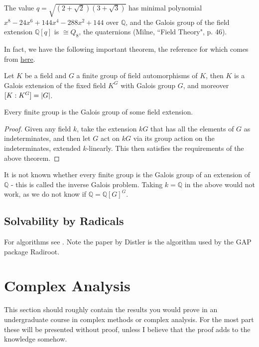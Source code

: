 \documentclass{article}
\begin{document}
\begin{example}
	The value $q = \sqrt{(2+\sqrt{2})(3+\sqrt{3})}$ has minimal polynomial $x^8 - 24x^6 + 144x^4 - 288x^2 + 144$ over $\mathbb{Q}$, and the Galois group of the field extension $\mathbb{Q}[q]$ is $\cong Q_8$, the quaternions (Milne, ``Field Theory", p. 46).
\end{example}

In fact, we have the following important theorem, the reference for which comes from \href{https://alexjbest.github.io/blog/maths/2017/05/02/every-group-is-a-galois-group.html}{here}. 
\begin{theorem}[Artin]
	Let $K$ be a field and $G$ a finite group of field automorphisms of $K$, then $K$ is a Galois extension of the fixed field $K^G$ with Galois group $G$, and moreover $[K : K^G] = \left\lvert G \right\rvert$. 
\end{theorem}
\begin{corollary}
	Every finite group is the Galois group of some field extension. 
\end{corollary}
\begin{proof}
	Given any field $k$, take the extension $kG$ that has all the elements of $G$ as indeterminates, and then let $G$ act on $kG$ via its group action on the indeterminates, extended $k$-linearly. This then satisfies the requirements of the above theorem.  
\end{proof}

\begin{remark}
	It is not known whether every finite group is the Galois group of an extension of $\mathbb{Q}$ - this is called the inverse Galois problem. Taking $k=\mathbb{Q}$ in the above would not work, as we do not know if $\mathbb{Q}=\mathbb{Q}[G]^G$.
\end{remark}
\subsection{Solvability by Radicals}
For algorithms see \cite{Landau1985, Distler2005}. Note the paper by Distler is the algorithm used by the GAP package Radiroot. 

\section{Complex Analysis}
This section should roughly contain the results you would prove in an undergraduate course in complex methods or complex analysis. For the most part these will be presented without proof, unless I believe that the proof adds to the knowledge somehow. 
\end{document}
